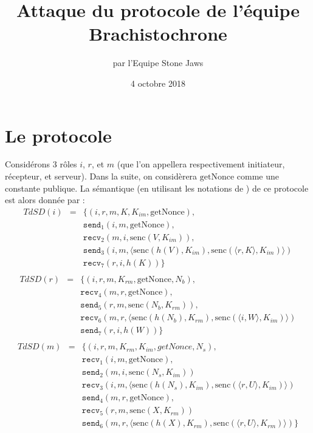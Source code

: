 \documentclass[a4paper,10pt]{article}
\title{Attaque du protocole de l'équipe Brachistochrone}
\author{par l'Equipe Stone Jaws}
\date{4 octobre 2018}
\begin{document}
\maketitle

\section{Le protocole}

Considérons 3 rôles $i$, $r$, et $m$ (que l'on appellera respectivement initiateur, récepteur, et serveur). Dans la suite, on considèrera $\textrm{getNonce}$ comme une constante publique. La sémantique (en utilisant les notations de \cite{cas}) de ce protocole est alors donnée par :
\begin{eqnarray*}
	TdSD(i) & = & \{ (i,r,m, K, K_{im}, \textrm{getNonce}), \\
		& & \texttt{send}_1(i,m, \textrm{getNonce} ), \\
		& & \texttt{recv}_2(m,i,  \textrm{senc}(V,K_{im}) ),\\
		& & \texttt{send}_3(i,m, \langle \textrm{senc}(h(V),K_{im}),  \textrm{senc}(\langle r, K \rangle,K_{im})\rangle   )  \\
		& & \texttt{recv}_7(r,i, h(K) ) \} \\
\end{eqnarray*}
\begin{eqnarray*}
	TdSD(r) & = & \{ (i,r,m, K_{rm}, \textrm{getNonce}, N_b), \\
		& & \texttt{recv}_4(m,r, \textrm{getNonce} ), \\
		& & \texttt{send}_5(r,m,  \textrm{senc}(N_b,K_{rm}) ),\\
		& & \texttt{recv}_6(m,r, \langle \textrm{senc}(h(N_b),K_{rm}),  \textrm{senc}(\langle i, W \rangle,K_{im})\rangle  ) \\
		& & \texttt{send}_7(r,i, h(W)  ) \} \\
\end{eqnarray*}
\begin{eqnarray*}
	TdSD(m) & = & \{ (i,r,m, K_{rm}, K_{im}, getNonce, N_s), \\
		& & \texttt{recv}_1(i,m, \textrm{getNonce} ), \\
		& & \texttt{send}_2(m,i, \textrm{senc}(N_s,K_{im})  ) \\
		& & \texttt{recv}_3(i,m, \langle \textrm{senc}(h(N_s),K_{im}),  \textrm{senc}(\langle r, U \rangle,K_{im})\rangle   ) \\
		& & \texttt{send}_4(m,r, \textrm{getNonce} ), \\
		& & \texttt{recv}_5(r,m, \textrm{senc}(X,K_{rm})  ) \\
		& & \texttt{send}_6(m,r, \langle \textrm{senc}(h(X),K_{rm}),  \textrm{senc}(\langle r, U \rangle,K_{rm})\rangle   ) \} \\
\end{eqnarray*}
\end{document}
